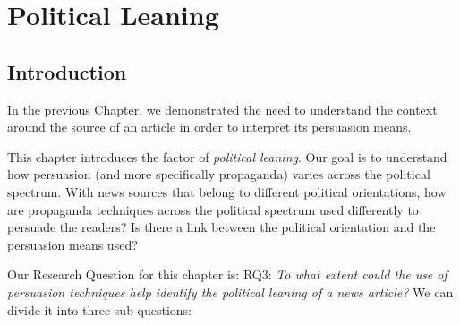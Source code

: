 \chapter{\statusgreen Political Leaning}
\label{chap:political_sides}


% 

\section{\statusgreen Introduction}


In the previous Chapter, %
we demonstrated the need to understand the context around the source of an article in order to interpret its persuasion means.

This chapter introduces the factor of \emph{political leaning}.
Our goal is to understand how persuasion (and more specifically propaganda) varies across the political spectrum.
With news sources that belong to different political orientations, how are propaganda techniques across the political spectrum used differently to persuade the readers?
Is there a link between the political orientation and the persuasion means used?


Our Research Question for this chapter is:
RQ3: \emph{To what extent could the use of persuasion techniques help identify the political leaning of a news article?} We can divide it into three sub-questions:

